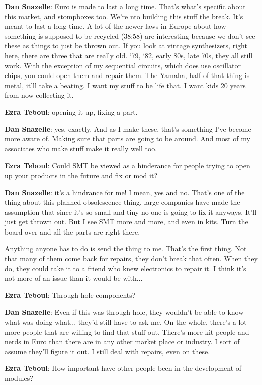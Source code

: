 \textbf{Dan Snazelle}: Euro is made to last a long time. That's what's specific about this market, and stompboxes too. We're nto building this stuff the break. It's meant to last a long time. A lot of the newer laws in Europe about how something is supposed to be recycled (38:58) are interesting because we don't see these as things to just be thrown out. If you look at vintage synthesizers, right here, there are three that are really old. `79, `82, early 80s, late 70s, they all still work. With the exception of my sequential circuits, which does use oscillator chips, you could open them and repair them. The Yamaha, half of that thing is metal, it'll take a beating. I want my stuff to be life that. I want kids 20 years from now collecting it. 

\textbf{Ezra Teboul}: opening it up, fixing a part. 

\textbf{Dan Snazelle}: yes, exactly. And as I make these, that's something I've become more aware of. Making sure that parts are going to be around. And most of my associates who make stuff make it really well too. 

\textbf{Ezra Teboul}: Could SMT be viewed as a hinderance for people trying to open up your products in the future and fix or mod it? 

\textbf{Dan Snazelle}: it's a hindrance for me! I mean, yes and no. That's one of the thing about this planned obsolescence thing, large companies have made the assumption that since it's so small and tiny no one is going to fix it anyways. It'll just get thrown out. But I see SMT more and more, and even in kits. Turn the board over and all the parts are right there. 

Anything anyone has to do is send the thing to me. That's the first thing. Not that many of them come back for repairs, they don't break that often. When they do, they could take it to a friend who knew electronics to repair it. I think it's not more of an issue than it would be with... 

\textbf{Ezra Teboul}: Through hole components? 

\textbf{Dan Snazelle}: Even if this was through hole, they wouldn't be able to know what was doing what... they'd still have to ask me. On the whole, there's a lot more people that are willing to find that stuff out. There's more kit people and nerds in Euro than there are in any other market place or industry. I sort of assume they'll figure it out. I still deal with repairs, even on these.

\textbf{Ezra Teboul}: How important have other people been in the development of modules? 

